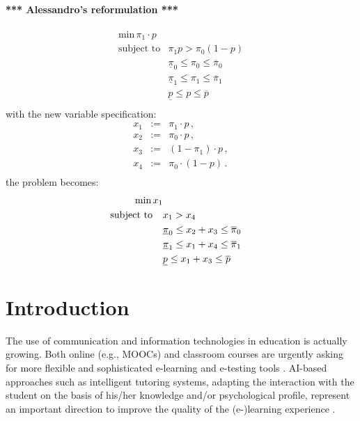 \documentclass[runningheads]{llncs}
\begin{document}
	
	\paragraph{*** Alessandro's reformulation ***}
	\begin{equation}
		\begin{split}
			\text{min} \displaystyle \, \pi_1 \cdot p \\
			\text{subject to} & \displaystyle \pi_1 p > \pi_0 (1-p)\\
			&\displaystyle \underline{\pi}_0 \leq \pi_0 \leq \overline{\pi}_0 \\
			&\displaystyle \underline{\pi}_1 \leq \pi_1 \leq \overline{\pi}_1 \\
			&\displaystyle \underline{p} \leq p \leq \overline{p} \\
		\end{split}
	\end{equation}
	with the new variable specification:
	\begin{eqnarray}
		x_1&:=&\pi_1 \cdot p \,,\\
		x_2&:=&\pi_0 \cdot p \,,\\
		x_3&:=&(1-\pi_1) \cdot p \,,\\
		x_4&:=& \pi_0 \cdot (1-p)\,.\\
	\end{eqnarray}
	the problem becomes:
	\begin{equation}
		\begin{split}
			\text{min} \displaystyle \, x_1 \\
			\text{subject to\phantom{xx}} & \displaystyle x_1 > x_4\\
			&\displaystyle \underline{\pi}_0 \leq x_2+x_3 \leq \overline{\pi}_0 \\
			&\displaystyle \underline{\pi}_1 \leq x_1+x_4 \leq \overline{\pi}_1 \\
			&\displaystyle \underline{p} \leq x_1+x_3 \leq \overline{p} \\
		\end{split}
	\end{equation}
	
	
	\section{Introduction}\label{sec:intro}
	The use of communication and information technologies in education is actually 
	growing. Both online (e.g., MOOCs) and classroom courses are urgently asking for 
	more flexible and sophisticated e-learning and e-testing tools 
	\cite{pollard2001exploring}. AI-based approaches such as intelligent tutoring systems, 
	adapting the interaction with the student on the basis of his/her knowledge and/or 
	psychological profile, represent an important direction to improve the quality of the 
	(e-)learning experience \cite{burns2014intelligent}.
	
\end{document}
